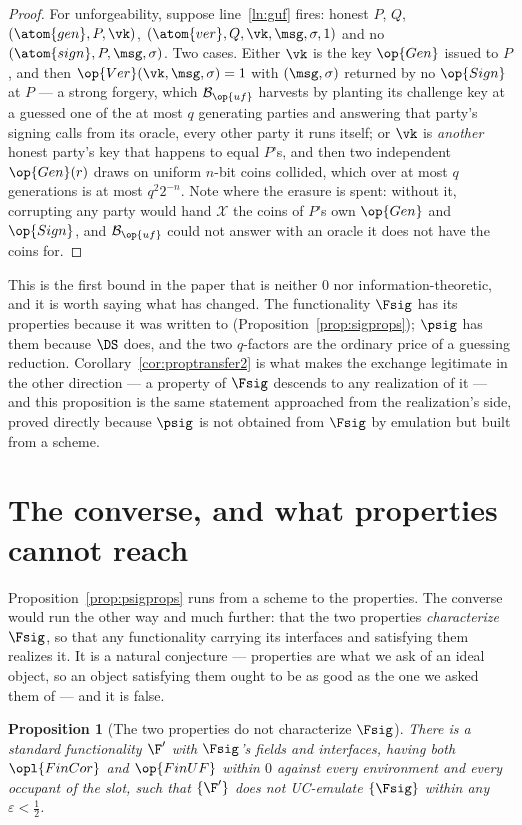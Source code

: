 \documentclass[10pt,oneside,openany]{book}
\theoremstyle{accentdef}
\theoremstyle{accentplain}
\newtheorem{proposition}[definition]{Proposition}
\begin{document}
\begin{proof}
For unforgeability, suppose line~\ref{ln:guf} fires: honest $P$, $Q$, $(\atom{gen},P,\vk)$,
$(\atom{ver},Q,\vk,\msg,\sigma,1)$ and no $(\atom{sign},P,\msg,\sigma)$. Two cases. Either $\vk$ is
the key $\op{Gen}$ issued to $P$, and then $\op{Ver}(\vk,\msg,\sigma) = 1$ with $(\msg,\sigma)$
returned by no $\op{Sign}$ at $P$ --- a strong forgery, which $\mathcal{B}_{\op{uf}}$ harvests by
planting its challenge key at a guessed one of the at most $q$ generating parties and answering
that party's signing calls from its oracle, every other party it runs itself; or $\vk$ is
\emph{another} honest party's key that happens to equal $P$'s, and then two independent
$\op{Gen}(r)$ draws on uniform $n$-bit coins collided, which over at most $q$ generations is at
most $q^{2}2^{-n}$. Note where the erasure is spent: without it, corrupting any party would hand
$\mathcal{X}$ the coins of $P$'s own $\op{Gen}$ and $\op{Sign}$, and $\mathcal{B}_{\op{uf}}$ could
not answer with an oracle it does not have the coins for.
\end{proof}

This is the first bound in the paper that is neither $0$ nor information-theoretic, and it is
worth saying what has changed. The functionality $\Fsig$ has its properties because it was written to
(Proposition~\ref{prop:sigprops}); $\psig$ has them because $\DS$ does, and the two $q$-factors
are the ordinary price of a guessing reduction. Corollary~\ref{cor:proptransfer2} is what makes
the exchange legitimate in the other direction --- a property of $\Fsig$ descends to any
realization of it --- and this proposition is the same statement approached from the realization's
side, proved directly because $\psig$ is not obtained from $\Fsig$ by emulation but built from a
scheme.

\section{The converse, and what properties cannot reach}\label{sec:sigconv}

Proposition~\ref{prop:psigprops} runs from a scheme to the properties. The converse would run the
other way and much further: that the two properties \emph{characterize} $\Fsig$, so that any
functionality carrying its interfaces and satisfying them realizes it. It is a natural conjecture
--- properties are what we ask of an ideal object, so an object satisfying them ought to be as good
as the one we asked them of --- and it is false.

\begin{proposition}[The two properties do not characterize $\Fsig$]\label{prop:convfails}
There is a standard functionality $\F'$ with $\Fsig$'s fields and interfaces, having both
$\opl{FinCor}$ and $\op{FinUF}$ within $0$ against every environment and every occupant of the
slot, such that $\{\F'\}$ does not UC-emulate $\{\Fsig\}$ within any $\varepsilon < \tfrac12$.
\end{proposition}
\end{document}
